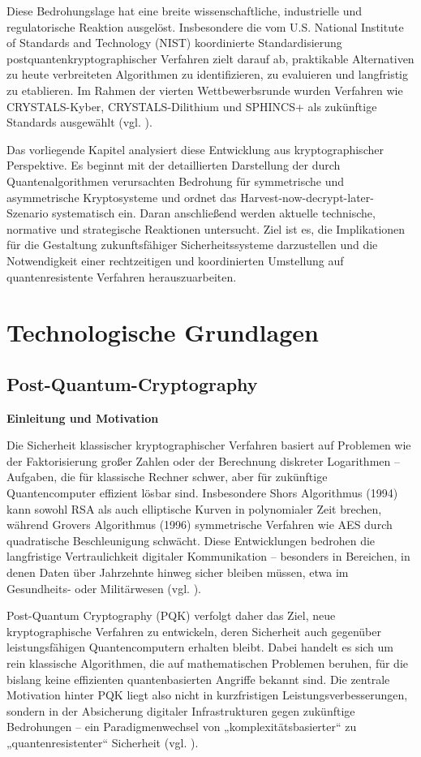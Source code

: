 Diese Bedrohungslage hat eine breite wissenschaftliche, industrielle und regulatorische Reaktion ausgelöst. Insbesondere die vom U.S. National Institute of Standards and Technology (NIST) koordinierte Standardisierung postquantenkryptographischer Verfahren zielt darauf ab, praktikable Alternativen zu heute verbreiteten Algorithmen zu identifizieren, zu evaluieren und langfristig zu etablieren. Im Rahmen der vierten Wettbewerbsrunde wurden Verfahren wie CRYSTALS-Kyber, CRYSTALS-Dilithium und SPHINCS+ als zukünftige Standards ausgewählt (vgl. \cite{alagic_status_2025nist_fips_2024}).

Das vorliegende Kapitel analysiert diese Entwicklung aus kryptographischer Perspektive. Es beginnt mit der detaillierten Darstellung der durch Quantenalgorithmen verursachten Bedrohung für symmetrische und asymmetrische Kryptosysteme und ordnet das Harvest-now-decrypt-later-Szenario systematisch ein. Daran anschließend werden aktuelle technische, normative und strategische Reaktionen untersucht. Ziel ist es, die Implikationen für die Gestaltung zukunftsfähiger Sicherheitssysteme darzustellen und die Notwendigkeit einer rechtzeitigen und koordinierten Umstellung auf quantenresistente Verfahren herauszuarbeiten.


\section{Technologische Grundlagen}
\subsection{Post-Quantum-Cryptography}
\textbf{Einleitung und Motivation}


Die Sicherheit klassischer kryptographischer Verfahren basiert auf Problemen wie der Faktorisierung großer Zahlen oder der Berechnung diskreter Logarithmen – Aufgaben, die für klassische Rechner schwer, aber für zukünftige Quantencomputer effizient lösbar sind. Insbesondere Shors Algorithmus (1994) kann sowohl RSA als auch elliptische Kurven in polynomialer Zeit brechen, während Grovers Algorithmus (1996) symmetrische Verfahren wie AES durch quadratische Beschleunigung schwächt. Diese Entwicklungen bedrohen die langfristige Vertraulichkeit digitaler Kommunikation – besonders in Bereichen, in denen Daten über Jahrzehnte hinweg sicher bleiben müssen, etwa im Gesundheits- oder Militärwesen (vgl. \cite{chen_l_et_al_report_2016}).

 
Post-Quantum Cryptography (PQK) verfolgt daher das Ziel, neue kryptographische Verfahren zu entwickeln, deren Sicherheit auch gegenüber leistungsfähigen Quantencomputern erhalten bleibt. Dabei handelt es sich um rein klassische Algorithmen, die auf mathematischen Problemen beruhen, für die bislang keine effizienten quantenbasierten Angriffe bekannt sind. Die zentrale Motivation hinter PQK liegt also nicht in kurzfristigen Leistungsverbesserungen, sondern in der Absicherung digitaler Infrastrukturen gegen zukünftige Bedrohungen – ein Paradigmenwechsel von „komplexitätsbasierter“ zu „quantenresistenter“ Sicherheit (vgl. \cite{bernstein_et_al_post-quantum_2009}).


